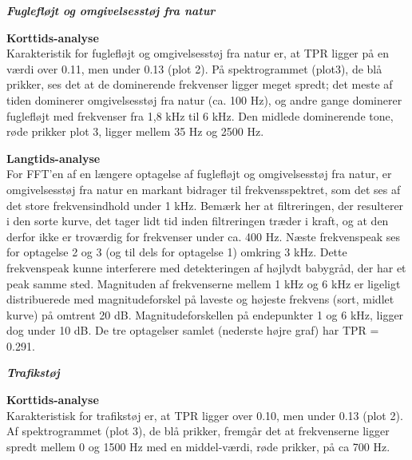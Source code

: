 
\newpage
\begin{center} \textit{\textbf{Fuglefløjt og omgivelsesstøj fra natur}} \end{center}
\textbf{Korttids-analyse} \\
Karakteristik for fuglefløjt og omgivelsesstøj fra natur er, at TPR ligger på en værdi over 0.11, men under 0.13 (plot 2). På spektrogrammet (plot3), de blå prikker, ses det at de dominerende frekvenser ligger meget spredt; det meste af tiden dominerer omgivelsesstøj fra natur (ca. 100 Hz), og andre gange dominerer fuglefløjt med frekvenser fra 1,8 kHz til 6 kHz. Den midlede dominerende tone, røde prikker plot 3, ligger mellem 35 Hz og 2500 Hz.


\newpage
\textbf{Langtids-analyse} \\
For FFT'en af en længere optagelse af fuglefløjt og omgivelsesstøj fra natur, er omgivelsesstøj fra natur en markant bidrager til frekvensspektret, som det ses af det store frekvensindhold under 1 kHz. Bemærk her at filtreringen, der resulterer i den sorte kurve, det tager lidt tid inden filtreringen træder i kraft, og at den derfor ikke er troværdig for frekvenser under ca. 400 Hz. Næste frekvenspeak ses for optagelse 2 og 3 (og til dels for optagelse 1) omkring 3 kHz. Dette frekvenspeak kunne interferere med detekteringen af højlydt babygråd, der har et peak samme sted. Magnituden af frekvenserne mellem 1 kHz og 6 kHz er ligeligt distribuerede med magnitudeforskel på laveste og højeste frekvens (sort, midlet kurve) på omtrent 20 dB. Magnitudeforskellen på endepunkter 1 og 6 kHz, ligger dog under 10 dB.
De tre optagelser samlet (nederste højre graf) har TPR = 0.291.


\newpage
\begin{center}\textit{\textbf{Trafikstøj}}\end{center}
\textbf{Korttids-analyse} \\
Karakteristisk for trafikstøj er, at TPR ligger over 0.10, men under 0.13 (plot 2). Af spektrogrammet (plot 3), de blå prikker, fremgår det at frekvenserne ligger spredt mellem 0 og 1500 Hz med en middel-værdi, røde prikker, på ca 700 Hz.

